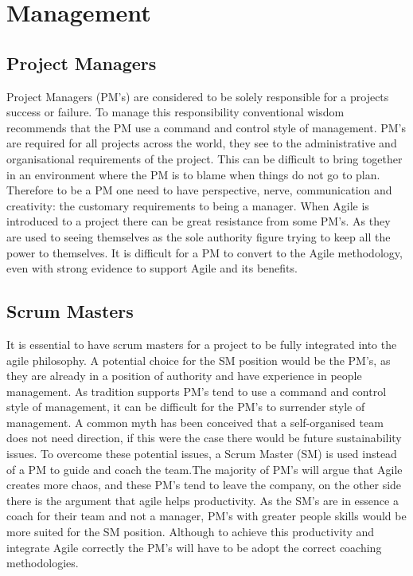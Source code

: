 \documentclass{scrartcl}
\begin{document}
\section{Management}


\subsection{Project Managers}
 
 Project Managers (PM's) are considered to be solely responsible for a projects success or failure\cite{Behavior}. To manage this responsibility conventional wisdom recommends that the PM use a command and control style of management\cite{MasterActivities}. PM's are required for all projects across the world, they see to the administrative and organisational requirements of the project\cite{Oxymoron}. This can be difficult to bring together in an environment where the PM is to blame when things do not go to plan. Therefore to be a PM one need to have perspective, nerve, communication and creativity: the customary requirements to being a manager\cite{Oxymoron}. When Agile is introduced to a project there can be great resistance from some PM's. As they are used to seeing themselves as the sole authority figure trying to keep all the power to themselves. It is difficult for a PM to convert to the Agile methodology\cite{Leader,ready}, even with strong evidence to support Agile and its benefits.
 
\subsection{Scrum Masters}

It is essential to have scrum masters for a project to be fully integrated into the agile philosophy\cite{Together}. A potential choice for the SM position would be the PM's, as they are already in a position of authority and have experience in people management. As tradition supports PM's tend to use a command and control style of management\cite{ManagerMaster}, it can be difficult for the PM's to surrender style of management\cite{Together}. A common myth has been conceived that a self-organised team does not need direction, if this were the case there would be future sustainability issues\cite{Oxymoron,Together}. To overcome these potential issues, a Scrum Master (SM) is used instead of a PM to guide and coach the team\cite{ManagerMaster}.The majority of PM's will argue that Agile creates more chaos, and these PM's tend to leave the company\cite{Together,ready}, on the other side there is the argument that agile helps productivity. As the SM's are in essence a coach for their team and not a manager, PM's with greater people skills would be more suited for the SM position\cite{Together}. Although to achieve this productivity and integrate Agile correctly the PM's will have to be adopt the correct coaching methodologies.
\end{document}
